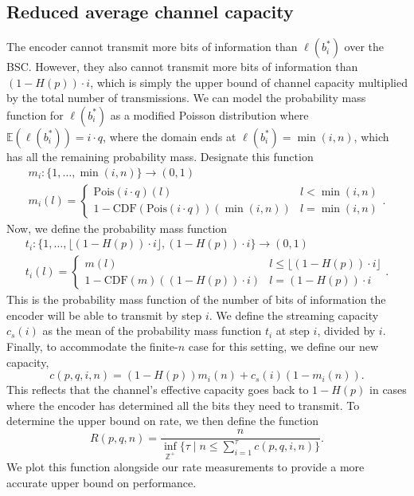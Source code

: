 \documentclass{IEEEtran}
\begin{document}
\subsection{Reduced average channel capacity}
The encoder cannot transmit more bits of information than $\ell(b_i^*)$ over
the BSC. However, they also cannot transmit more bits of information than
$(1-H(p))\cdot i$, which is simply the upper bound of channel capacity multiplied
by the total number of transmissions.
We can model the probability mass function for $\ell(b_i^*)$ as a modified
Poisson distribution where $\mathbb{E}(\ell(b_i^*))=i\cdot q$, where the domain
ends at $\ell(b_i^*)=\min(i,n)$, which has all the remaining probability mass.
Designate this function
\begin{multline}
m_i:\{1,\dots,\min(i,n)\} \to (0,1)\\
	m_i(l) = \begin{cases}
	\mathrm{Pois}(i\cdot q)(l) & l < \min(i,n) \\
	1-\mathrm{CDF}(\mathrm{Pois}(i\cdot q))(\min(i,n)) & l= \min(i,n)
	\end{cases}.
\end{multline}
Now, we
define the probability mass function
\begin{multline}
t_i: \{1,\dots,\lfloor (1-H(p)) \cdot i\rfloor, (1-H(p))\cdot i\} \to (0,1)\\
t_i(l) = \begin{cases}
	m(l) & l \leq \lfloor (1-H(p)) \cdot i\rfloor\\
	1-\mathrm{CDF}(m)((1-H(p))\cdot i) & l = (1-H(p))\cdot i
\end{cases}.
\end{multline}
This is the probability mass function
of the number of bits of information the encoder will be able to transmit by
step $i$. We define the streaming capacity $c_s(i)$ as the mean of the
probability mass function $t_i$ at step $i$, divided by $i$. Finally, to
accommodate the finite-$n$ case for this setting, we define our new capacity,
\begin{equation}
c(p,q,i,n)=(1-H(p))m_i(n)+c_s(i)(1-m_i(n)).
\end{equation}
This reflects that the channel's effective capacity goes back to $1-H(p)$ in
cases where the encoder has determined all the bits they need to transmit.
To determine the upper bound on rate, we then define the function
\begin{equation}
R(p,q,n)= \frac{n}{\inf_{\mathbb{Z}^+}\{\tau \mid n \leq
\sum_{i=1}^{\tau}c(p,q,i,n) \}}.
\end{equation}
We plot this function alongside our rate measurements to provide a more accurate
upper bound on performance.
\end{document}
